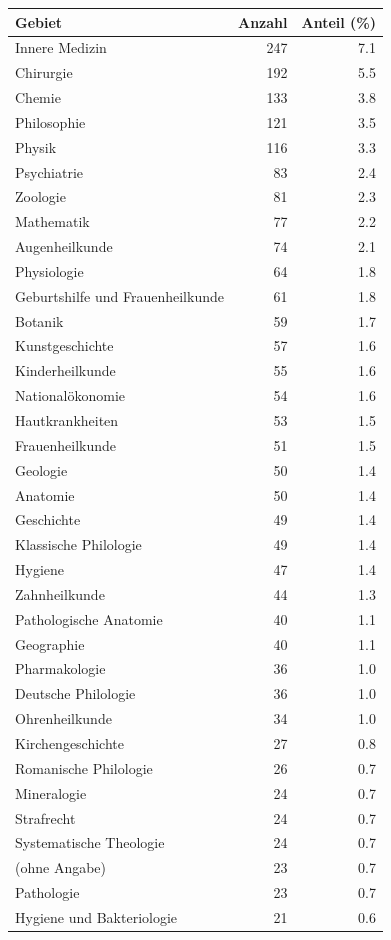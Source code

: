 \begin{tabular}{lrr}
\toprule
Gebiet & Anzahl & Anteil (\%) \\
\midrule
Innere Medizin & 247 & 7.1 \\
Chirurgie & 192 & 5.5 \\
Chemie & 133 & 3.8 \\
Philosophie & 121 & 3.5 \\
Physik & 116 & 3.3 \\
Psychiatrie & 83 & 2.4 \\
Zoologie & 81 & 2.3 \\
Mathematik & 77 & 2.2 \\
Augenheilkunde & 74 & 2.1 \\
Physiologie & 64 & 1.8 \\
Geburtshilfe und Frauenheilkunde & 61 & 1.8 \\
Botanik & 59 & 1.7 \\
Kunstgeschichte & 57 & 1.6 \\
Kinderheilkunde & 55 & 1.6 \\
Nationalökonomie & 54 & 1.6 \\
Hautkrankheiten & 53 & 1.5 \\
Frauenheilkunde & 51 & 1.5 \\
Geologie & 50 & 1.4 \\
Anatomie & 50 & 1.4 \\
Geschichte & 49 & 1.4 \\
Klassische Philologie & 49 & 1.4 \\
Hygiene & 47 & 1.4 \\
Zahnheilkunde & 44 & 1.3 \\
Pathologische Anatomie & 40 & 1.1 \\
Geographie & 40 & 1.1 \\
Pharmakologie & 36 & 1.0 \\
Deutsche Philologie & 36 & 1.0 \\
Ohrenheilkunde & 34 & 1.0 \\
Kirchengeschichte & 27 & 0.8 \\
Romanische Philologie & 26 & 0.7 \\
Mineralogie & 24 & 0.7 \\
Strafrecht & 24 & 0.7 \\
Systematische Theologie & 24 & 0.7 \\
(ohne Angabe) & 23 & 0.7 \\
Pathologie & 23 & 0.7 \\
Hygiene und Bakteriologie & 21 & 0.6 \\

\end{tabular}
